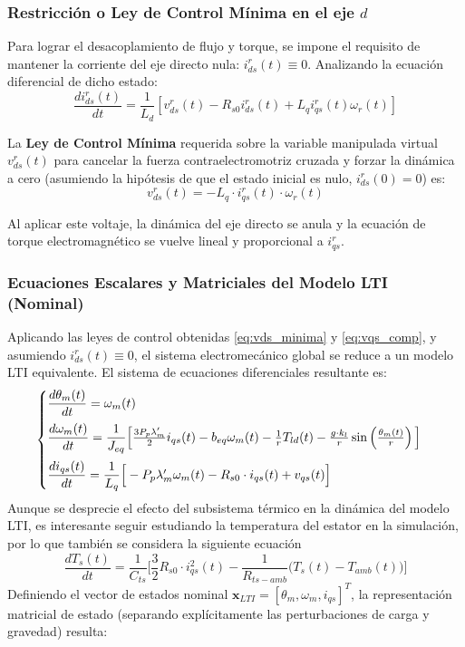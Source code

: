 \documentclass[12pt, a4paper,journal, onecolumn, compsoc]{IEEEtran}
\begin{document}
\subsubsection{Restricción o Ley de Control Mínima en el eje $d$}
Para lograr el desacoplamiento de flujo y torque, se impone el requisito de mantener la corriente del eje directo nula: $i_{ds}^r(t) \equiv 0$. Analizando la ecuación diferencial de dicho estado:
\begin{equation}
    \frac{di_{ds}^r(t)}{dt} = \frac{1}{L_d} \left[ v_{ds}^r(t) - R_{s0} i_{ds}^r(t) + L_q i_{qs}^r(t) \omega_r(t) \right]
\end{equation}

La \textbf{Ley de Control Mínima} requerida sobre la variable manipulada virtual $v_{ds}^r(t)$ para cancelar la fuerza contraelectromotriz cruzada y forzar la dinámica a cero (asumiendo la hipótesis de que el estado inicial es nulo, $i_{ds}^r(0) = 0$) es:
\begin{equation} \label{eq:vds_minima}
    v_{ds}^r(t) = -L_q \cdot i_{qs}^r(t) \cdot \omega_r(t)
\end{equation}

Al aplicar este voltaje, la dinámica del eje directo se anula y la ecuación de torque electromagnético se vuelve lineal y proporcional a $i_{qs}^r$.

\subsubsection{Ecuaciones Escalares y Matriciales del Modelo LTI (Nominal)}
Aplicando las leyes de control obtenidas \eqref{eq:vds_minima} y \eqref{eq:vqs_comp}, y asumiendo $i_{ds}^r(t) \equiv 0$, el sistema electromecánico global se reduce a un modelo LTI equivalente. El sistema de ecuaciones diferenciales resultante es:
\begin{equation} \label{eq:sis_escalar_LTI}
\begin{cases}
    \vspace{0.2cm}
    \dfrac{d\theta_m(t)}{dt} = \omega_m(t) \\
    \vspace{0.2cm}
    \dfrac{d\omega_m(t)}{dt} = \dfrac{1}{J_{eq}}\Big[\frac{3 P_p \lambda'_m}{2} i_{qs}(t) - b_{eq} \omega_m(t) - \frac{1}{r} T_{ld}(t) - \frac{g\cdot k_l}{r} \sin\left(\frac{\theta_m(t)}{r}\right)\Big] \\
    \dfrac{di_{qs}(t)}{dt} = \dfrac{1}{L_q}\Big[-P_p \lambda'_m \omega_m(t) - R_{s0}\cdot i_{qs}(t) + v_{qs}(t)\Big]
\end{cases}
\end{equation}
Aunque se desprecie el efecto del subsistema térmico en la dinámica del modelo LTI, es interesante seguir estudiando la temperatura del estator en la simulación, por lo que también se considera la siguiente ecuación
\[\dfrac{dT_s(t)}{dt} = \dfrac{1}{C_{ts}}\Big[\frac{3}{2}R_{s0}\cdot i_{qs}^2(t)-\frac{1}{R_{ts-amb}}\big(T_s(t) - T_{amb}(t)\big)\Big]\]
Definiendo el vector de estados nominal $\mathbf{x}_{LTI} = [\theta_m, \omega_m, i_{qs}]^T$, la representación matricial de estado (separando explícitamente las perturbaciones de carga y gravedad) resulta:
\end{document}
